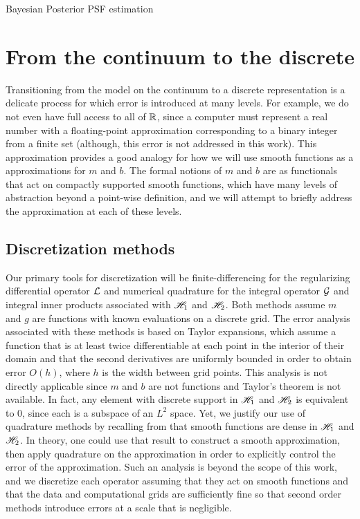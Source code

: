 \begin{chapter}{Bayesian Posterior PSF estimation}
\section{From the continuum to the discrete} \label{sec:discretization}

Transitioning from the model on the continuum to a discrete representation is a delicate process for which error is introduced at many levels.  
For example, we do not even have full access to all of $\mathbb R$, since a computer must represent a real number with a floating-point approximation corresponding to a binary integer from a finite set (although, this error is not addressed in this work). 
This approximation provides a good analogy for how we will use smooth functions as a approximations for $m$ and $b$.
The formal notions of $m$ and $b$ are as functionals that act on compactly supported smooth functions, which have many levels of abstraction beyond a point-wise definition, and we will attempt to briefly address the approximation at each of these levels.

\subsection{Discretization methods}
Our primary tools for discretization will be finite-differencing for the regularizing differential operator $\mathcal L$ and numerical quadrature for the integral operator $\mathcal G$ and integral inner products associated with $\mathscr H_1$ and $\mathscr H_2$.
Both methods assume $m$ and $g$ are functions with known evaluations on a discrete grid.
The error analysis associated with these methods is based on Taylor expansions, which assume a function that is at least twice differentiable at each point in the interior of their domain and that the second derivatives are uniformly bounded in order to obtain error $O(h)$, where $h$ is the width between grid points.
This analysis is not directly applicable since $m$ and $b$ are not functions and Taylor's theorem is not available.
In fact, any element with discrete support in $\mathscr H_1$ and $\mathscr H_2$ is equivalent to $0$, since each is a subspace of an $L^2$ space.
Yet, we justify our use of quadrature methods by recalling from  that smooth functions are dense in $\mathscr H_1$ and $\mathscr H_2$.
In theory, one could use that result to construct a smooth approximation, then apply quadrature on the approximation in order to explicitly control the error of the approximation.
Such an analysis is beyond the scope of this work, and we discretize each operator assuming that they act on smooth functions and that the data and computational grids are sufficiently fine so that second order methods introduce errors at a scale that is negligible.


\end{chapter}
